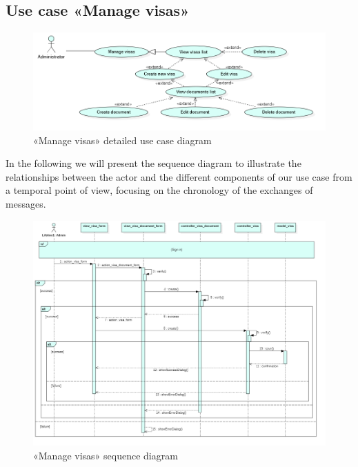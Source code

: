 \subsection*{Use case «Manage visas»}
\begin{figure}[H]
    \begin{center}
        \includegraphics[scale=0.45]{img/sprint1_visa_usecase.png}
        \caption{«Manage visas» detailed use case diagram}
    \end{center}    
\end{figure}
    In the following we will present the sequence diagram to illustrate the relationships between the actor and the different components of our use case from a temporal point of view, focusing on the chronology of the exchanges of messages.
    \begin{figure}[H]
     \begin{center}
        \includegraphics[scale=0.355]{img/sprint1_visa_sequ.png}
        \caption{«Manage visas» sequence diagram}
    \end{center}   
    \end{figure}
    
